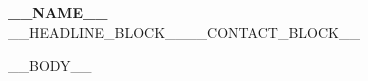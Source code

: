 \documentclass[letterpaper,10pt]{article}
\begin{document}
\begin{center}
    \textbf{\Huge \scshape __NAME__} \\ \vspace{2pt}
__HEADLINE_BLOCK____CONTACT_BLOCK__\end{center}

__BODY__
\end{document}
